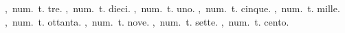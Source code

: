 ,\ num.\ t.
tre.
,\ num.\ t.
dieci.
,\ num.\ t.
uno.
,\ num.\ t.
cinque.
,\ num.\ t.
mille.
,\ num.\ t.
ottanta.
,\ num.\ t.
nove.
,\ num.\ t.
sette.
,\ num.\ t.
cento.

